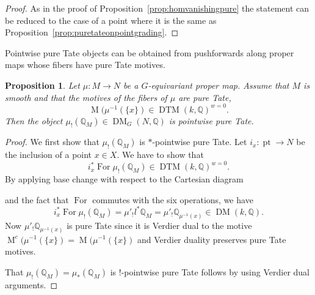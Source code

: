 \documentclass{amsart}
\theoremstyle{plain}
\newtheorem{theorem}{Theorem}[section]
\newtheorem{proposition}[theorem]{Proposition}
\theoremstyle{TheoremNum}
\theoremstyle{definition}
\theoremstyle{remark}
\numberwithin{equation}{section}
\newcommand{\Q}{\mathbb{Q}}
\newcommand{\Tt}{\mathcal{T}}
\newcommand{\Mot}{\operatorname{M}}
\newcommand{\DM}{\operatorname{DM}}
\newcommand{\DTM}{\operatorname{DTM}}
\newcommand{\K}{\operatorname{K}}
\newcommand{\For}{\operatorname{For}}
\newcommand{\poi}{\operatorname{pt}}
\begin{document}
\begin{proof}
As in the proof of Proposition~\ref{prop:homvanishingpure} the statement can be reduced to the case of a point where it is the same as Proposition~\ref{prop:puretateonpointgrading}.
\end{proof}
Pointwise pure Tate objects can be obtained from pushforwards along proper maps whose fibers have pure Tate motives.
\begin{proposition}\label{prop:puretatefiberimpliespuretate}
Let $\mu: M\to N$ be a $G$-equivariant proper map. Assume that $M$ is smooth and that the motives of the fibers of $\mu$ are pure Tate, 
$$\Mot(\mu^{-1}(\{x\})\in \DTM(k,\Q)^{w=0}.$$
Then the object $\mu_!(\Q_M)\in \DM_G(N,\Q)$ is pointwise pure Tate.
\end{proposition}
\begin{proof}
We first show that $\mu_!(\Q_M)$ is $*$-pointwise pure Tate. 
Let $i_x:\poi\to N$ be the inclusion of a point $x\in X.$ We have to show that
$$i_x^*\For\mu_!(\Q_M)\in\DTM(k,\Q)^{w=0}.$$
By applying base change with respect to the Cartesian diagram
\begin{center}
\end{center}
and the fact that $\For$ commutes with the six operations, we have
$$i_x^*\For\mu_!(\Q_M)=\mu'_!l^*\Q_M=\mu'_!\Q_{\mu^{-1}(x)}\in \DM(k,\Q).$$
Now $\mu'_!\Q_{\mu^{-1}(x)}$ is pure Tate since it is Verdier dual to the motive $\Mot^c(\mu^{-1}(\{x\})=\Mot(\mu^{-1}(\{x\})$
and Verdier duality preserves pure Tate motives.

That $\mu_!(\Q_M)=\mu_*(\Q_M)$ is $!$-pointwise pure Tate follows by using Verdier dual arguments.
\end{proof}
\end{document}
